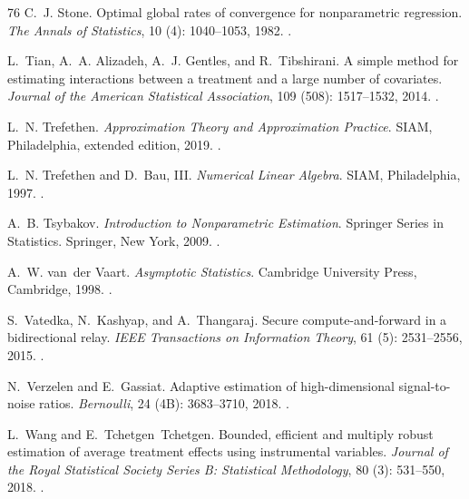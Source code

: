 \documentclass[12pt,oneside,openany]{book}
\numberwithin{equation}{chapter}
\theoremstyle{plain}
\theoremstyle{definition}
\theoremstyle{remark}
\begin{document}
\begin{thebibliography}{76}
C.~J. Stone.
\newblock Optimal global rates of convergence for nonparametric regression.
\newblock \emph{The Annals of Statistics}, 10 (4):
  1040--1053, 1982.
\newblock {}.

L.~Tian, A.~A. Alizadeh, A.~J. Gentles, and R.~Tibshirani.
\newblock A simple method for estimating interactions between a treatment and a
  large number of covariates.
\newblock \emph{Journal of the American Statistical Association}, 109
  (508): 1517--1532, 2014.
\newblock {}.

L.~N. Trefethen.
\newblock \emph{Approximation Theory and Approximation Practice}.
\newblock SIAM, Philadelphia, extended edition, 2019.
\newblock {}.

L.~N. Trefethen and D.~Bau, III.
\newblock \emph{Numerical Linear Algebra}.
\newblock SIAM, Philadelphia, 1997.
\newblock {}.

A.~B. Tsybakov.
\newblock \emph{Introduction to Nonparametric Estimation}.
\newblock Springer Series in Statistics. Springer, New York, 2009.
\newblock {}.

A.~W. van~der Vaart.
\newblock \emph{Asymptotic Statistics}.
\newblock Cambridge University Press, Cambridge, 1998.
\newblock {}.

S.~Vatedka, N.~Kashyap, and A.~Thangaraj.
\newblock Secure compute-and-forward in a bidirectional relay.
\newblock \emph{IEEE Transactions on Information Theory}, 61
  (5): 2531--2556, 2015.
\newblock {}.

N.~Verzelen and E.~Gassiat.
\newblock Adaptive estimation of high-dimensional signal-to-noise ratios.
\newblock \emph{Bernoulli}, 24 (4B): 3683--3710, 2018.
\newblock {}.

L.~Wang and E.~Tchetgen~Tchetgen.
\newblock Bounded, efficient and multiply robust estimation of average
  treatment effects using instrumental variables.
\newblock \emph{Journal of the Royal Statistical Society Series B: Statistical
  Methodology}, 80 (3): 531--550, 2018.
\newblock {}.


\end{thebibliography}
\end{document}
